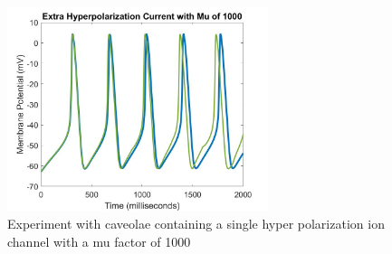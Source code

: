 \documentclass{bmcart}%
\begin{document}
\begin{figure}[ht]
  \centering
  \includegraphics[width=3in]{images/hMu1000}
  \caption[hMu1000]
  {Experiment with caveolae containing a single hyper polarization ion\\
  channel with a mu factor of 1000}
\label{fig:hMu1000}
\end{figure}


\pagebreak

\label{LastPage}



\end{document}
